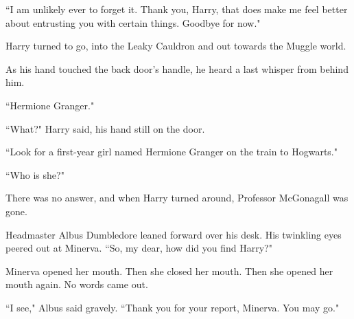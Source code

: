 ``I am unlikely ever to forget it. Thank you, Harry, that does make me feel better about entrusting you with certain things. Goodbye for now."

Harry turned to go, into the Leaky Cauldron and out towards the Muggle world.

As his hand touched the back door's handle, he heard a last whisper from behind him.

``Hermione Granger."

``What?" Harry said, his hand still on the door.

``Look for a first-year girl named Hermione Granger on the train to Hogwarts."

``Who is she?"

There was no answer, and when Harry turned around, Professor McGonagall was gone.


Headmaster Albus Dumbledore leaned forward over his desk. His twinkling eyes peered out at Minerva. ``So, my dear, how did you find Harry?"

Minerva opened her mouth. Then she closed her mouth. Then she opened her mouth again. No words came out.

``I see," Albus said gravely. ``Thank you for your report, Minerva. You may go."

